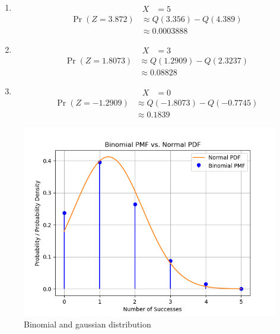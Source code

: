 \documentclass[journal,11pt,onecolumn]{IEEEtran}
\providecommand{\pr}[1]{\ensuremath{\Pr\left(#1\right)}}
\providecommand{\qfunc}[1]{\ensuremath{Q\left(#1\right)}}
\providecommand{\pr}[1]{\ensuremath{\Pr\left(#1\right)}}
\providecommand{\qfunc}[1]{\ensuremath{Q\left(#1\right)}}
\providecommand{\qfunc}[1]{\ensuremath{Q\left(#1\right)}}
\begin{document}
\begin{enumerate}
	\item 
	\begin{align}
		X&=5
	\end{align}
	\begin{align}
	\pr{Z=3.872}&\approx \qfunc{3.356} - \qfunc{4.389}\\
	&\approx 0.0003888
	\end{align}
	\item 
	\begin{align}
		X&=3
	\end{align}
	\begin{align}
	\pr{Z=1.8073}&\approx \qfunc{1.2909} - \qfunc{2.3237}\\
	&\approx 0.08828
	\end{align}
	\item 
	\begin{align}
		X&=0
	\end{align}
	\begin{align}
	\pr{Z=-1.2909}&\approx \qfunc{-1.8073} - \qfunc{-0.7745}\\
	&\approx 0.1839
	\end{align}
\end{enumerate}

\begin{figure}[ht!]
	\centering
	\includegraphics[width=\columnwidth]{figs/fig.png}
	\caption{Binomial and gaussian distribution}
	\label{fig:gauss9.3.3}
\end{figure}
\end{document}
